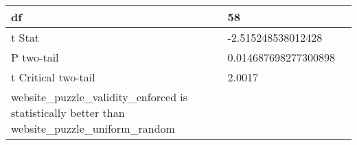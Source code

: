 \documentclass[11pt]{article}
\begin{document}
\begin{table}[]
{\begin{tabular}{|l|l|l|}
    df                                                                                                & 58                               &                                     \\ \hline
    t Stat                                                                                            & -2.515248538012428               &                                     \\ \hline
    P two-tail                                                                                        & 0.014687698277300898             &                                     \\ \hline
    t Critical two-tail                                                                               & 2.0017                           &                                     \\ \hline
    website\_puzzle\_validity\_enforced is statistically better than website\_puzzle\_uniform\_random &                                  &                                     \\ \hline
    \end{tabular}%
    }
\end{table}
\end{document}
